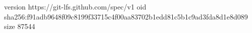 version https://git-lfs.github.com/spec/v1
oid sha256:f91adb9648f09c8199f33715c4f00aa83702b1edd81c5b1c9ad3fda8d1e8d089
size 87544
